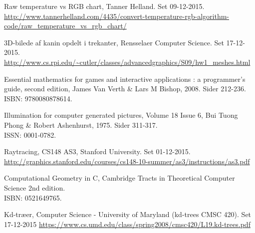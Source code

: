 \begin{thebibliography}{99}
  Raw temperature vs RGB chart,
  Tanner Helland. 
  Set 09-12-2015.\\
  \url{http://www.tannerhelland.com/4435/convert-temperature-rgb-algorithm-code/raw_temperature_vs_rgb_chart/}
  
  3D-bilede af kanin opdelt i trekanter,
  Rensselaer Computer Science.
  Set 17-12-2015.\\
  \url{http://www.cs.rpi.edu/~cutler/classes/advancedgraphics/S09/hw1_meshes.html}

  Essential mathematics for games and interactive applications : a programmer's guide, second edition, James Van Verth \& Lars M   Bishop, 2008. Sider 212-236.\\
  ISBN: 9780080878614.
  
  Illumination for computer generated pictures, Volume 18 Issue 6, Bui Tuong Phong \& Robert Ashenhurst, 1975. Sider 311-317. \\
  ISSN: 0001-0782.

  Raytracing, 
  CS148 AS3, Stanford University. 
  Set 01-12-2015.\\
  \url{http://graphics.stanford.edu/courses/cs148-10-summer/as3/instructions/as3.pdf}

  Computational Geometry in C,
  Cambridge Tracts in Theoretical Computer Science 2nd edition. \\
  ISBN: 0521649765.

  Kd-træer,
  Computer Science - University of Maryland (kd-trees CMSC 420).
  Set 17-12-2015
  \url{https://www.cs.umd.edu/class/spring2008/cmsc420/L19.kd-trees.pdf}
  
\end{thebibliography}
\clearpage